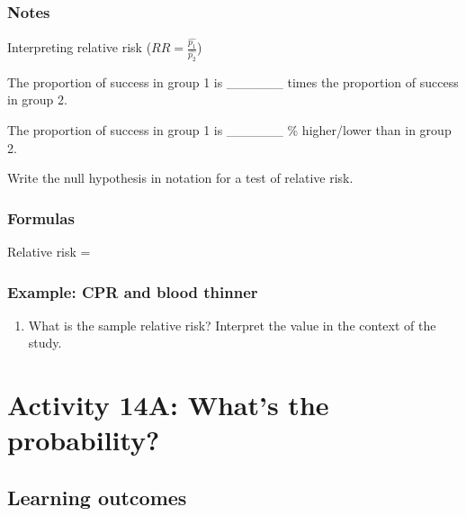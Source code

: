 \documentclass[
]{report}
\providecommand{\tightlist}{%
  \setlength{\itemsep}{0pt}\setlength{\parskip}{0pt}}
\newcommand{\rgs}{\vspace{12pt}} %
\newcommand{\rgi}{\hspace{24pt}}  %
\begin{document}
\hypertarget{notes-25}{%
\subsubsection*{Notes}\label{notes-25}}

Interpreting relative risk (\(RR = \frac{\hat{p_1}}{\hat{p_2}}\))

\rgi The proportion of success in group 1 is \_\_\_\_\_\_ times the proportion of success in group 2.

\rgi The proportion of success in group 1 is \_\_\_\_\_\_ \% higher/lower than in group 2.

Write the null hypothesis in notation for a test of relative risk.
\rgs

\hypertarget{formulas-8}{%
\subsubsection*{Formulas}\label{formulas-8}}

Relative risk =
\rgs

\hypertarget{example-cpr-and-blood-thinner-2}{%
\subsubsection*{Example: CPR and blood thinner}\label{example-cpr-and-blood-thinner-2}}

\begin{enumerate}
\def\labelenumi{\arabic{enumi}.}
\tightlist
\item
  What is the sample relative risk? Interpret the value in the context of the study.
  \rgs
  \rgs
\end{enumerate}

\newpage

\hypertarget{activity-14a-whats-the-probability}{%
\section{Activity 14A: What's the probability?}\label{activity-14a-whats-the-probability}}


\hypertarget{learning-outcomes-28}{%
\subsection{Learning outcomes}\label{learning-outcomes-28}}
\end{document}
